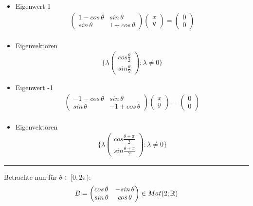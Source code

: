 \begin{itemize}
\item Eigenwert 1
\begin{align}
\begin{pmatrix} 1-cos\, \theta & sin\, \theta \\ sin\, \theta & 1+cos\, \theta\end{pmatrix} \begin{pmatrix} x \\ y \end{pmatrix} = \begin{pmatrix} 0 \\ 0 \end{pmatrix} \\
\end{align}
\item Eigenvektoren
\begin{align}
\{\lambda \begin{pmatrix} cos \frac{\theta}{2} \\ sin \frac{\theta}{2}\end{pmatrix}: \lambda \neq 0\}
\end{align}

\item Eigenwert -1
\begin{align}
\begin{pmatrix} -1-cos\, \theta & sin\, \theta \\ sin\, \theta & -1+cos\, \theta\end{pmatrix} \begin{pmatrix} x \\ y \end{pmatrix} = \begin{pmatrix} 0 \\ 0 \end{pmatrix} \\
\end{align}
\item Eigenvektoren
\begin{align}
\{\lambda \begin{pmatrix} cos \frac{\theta + \pi}{2} \\ sin \frac{\theta + \pi}{2}\end{pmatrix}: \lambda \neq 0\}
\end{align}
\end{itemize}
\vspace*{0.2cm} \rule{\linewidth}{0.3mm}\vspace*{0.1cm}
Betrachte nun für $\theta \in [0, 2\pi)$:
\begin{align}
B = \begin{pmatrix} cos\, \theta & -sin\, \theta \\ sin\, \theta & cos\, \theta\end{pmatrix} \in Mat(2; \mathbb{R})
\end{align}
